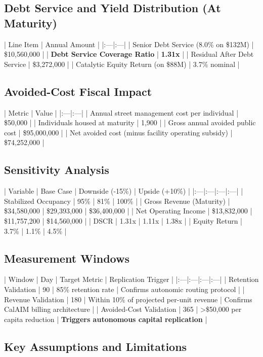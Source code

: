 \documentclass[12pt, letterpaper]{article}
\begin{document}
\subsection{Debt Service and Yield Distribution (At Maturity)}

| Line Item | Annual Amount |
|:---|:---|
| Senior Debt Service (8.0\% on \$132M) | \$10,560,000 |
| \textbf{Debt Service Coverage Ratio} | \textbf{1.31x} |
| Residual After Debt Service | \$3,272,000 |
| Catalytic Equity Return (on \$88M) | 3.7\% nominal |

\subsection{Avoided-Cost Fiscal Impact}

| Metric | Value |
|:---|:---|
| Annual street management cost per individual | \$50,000 |
| Individuals housed at maturity | 1,900 |
| Gross annual avoided public cost | \$95,000,000 |
| Net avoided cost (minus facility operating subsidy) | \$74,252,000 |

\subsection{Sensitivity Analysis}

| Variable | Base Case | Downside (-15\%) | Upside (+10\%) |
|:---|:---|:---|:---|
| Stabilized Occupancy | 95\% | 81\% | 100\% |
| Gross Revenue (Maturity) | \$34,580,000 | \$29,393,000 | \$36,400,000 |
| Net Operating Income | \$13,832,000 | \$11,757,200 | \$14,560,000 |
| DSCR | 1.31x | 1.11x | 1.38x |
| Equity Return | 3.7\% | 1.1\% | 4.5\% |

\subsection{Measurement Windows}

| Window | Day | Target Metric | Replication Trigger |
|:---|:---|:---|:---|
| Retention Validation | 90 | 85\% retention rate | Confirms autonomic routing protocol |
| Revenue Validation | 180 | Within 10\% of projected per-unit revenue | Confirms CalAIM billing architecture |
| Avoided-Cost Validation | 365 | >\$50,000 per capita reduction | \textbf{Triggers autonomous capital replication} |

\subsection{Key Assumptions and Limitations}
\end{document}
